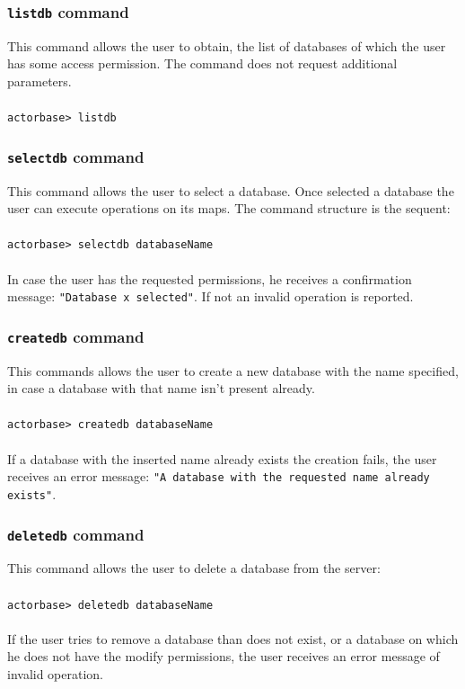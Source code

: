 \documentclass[a4paper]{article}
\begin{document}
	\subsubsection{\texttt{listdb} command}
	This command allows the user to obtain, the list of databases of which the user has some access permission. The command does not request additional parameters.
	\\ \\
	\texttt{actorbase>	listdb}

	\subsubsection{\texttt{selectdb} command}
	This command allows the user to select a database. Once selected a database the user can execute operations on its maps. The command structure is the sequent:
	\\ \\
	\texttt{actorbase>	selectdb databaseName}
	\\ \\
	In case the user has the requested permissions, he receives a confirmation message: \texttt{"Database x selected"}. If not an invalid operation is reported.

	\subsubsection{\texttt{createdb} command}
	This commands allows the user to create a new database with the name specified, in case a database with that name isn't present already.
	\\ \\
	\texttt{actorbase>	createdb databaseName}
	\\ \\
	If a database with the inserted name already exists the creation fails, the user receives an error message: \texttt{"A database with the requested name already exists"}.

	\subsubsection{\texttt{deletedb} command}
	This command allows the user to delete a database from the server:
	\\ \\
	\texttt{actorbase>	deletedb databaseName}
	\\ \\
	If the user tries to remove a database than does not exist, or a database on which he does not have the modify permissions, the user receives an error message of invalid operation.
	
\end{document}
